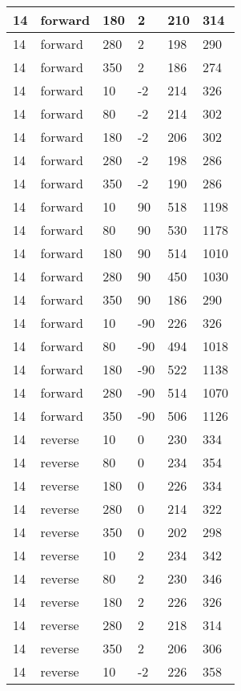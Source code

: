 \begin{table}
\begin{center}
\begin{tabular}{|l|l|l|l|l|l|}
			\hline
			14 & forward & 180 & 2 & 210 & 314 \\
			\hline
			14 & forward & 280 & 2 & 198 & 290 \\
			\hline
			14 & forward & 350 & 2 & 186 & 274 \\
			\hline
			14 & forward & 10 & -2 & 214 & 326 \\
			\hline
			14 & forward & 80 & -2 & 214 & 302 \\
			\hline
			14 & forward & 180 & -2 & 206 & 302 \\
			\hline
			14 & forward & 280 & -2 & 198 & 286 \\
			\hline
			14 & forward & 350 & -2 & 190 & 286 \\
			\hline
			14 & forward & 10 & 90 & 518 & 1198 \\
			\hline
			14 & forward & 80 & 90 & 530 & 1178 \\
			\hline
			14 & forward & 180 & 90 & 514 & 1010 \\
			\hline
			14 & forward & 280 & 90 & 450 & 1030 \\
			\hline
			14 & forward & 350 & 90 & 186 & 290 \\
			\hline
			14 & forward & 10 & -90 & 226 & 326 \\
			\hline
			14 & forward & 80 & -90 & 494 & 1018 \\
			\hline
			14 & forward & 180 & -90 & 522 & 1138 \\
			\hline
			14 & forward & 280 & -90 & 514 & 1070 \\
			\hline
			14 & forward & 350 & -90 & 506 & 1126 \\
			\hline
			14 & reverse & 10 & 0 & 230 & 334 \\
			\hline
			14 & reverse & 80 & 0 & 234 & 354 \\
			\hline
			14 & reverse & 180 & 0 & 226 & 334 \\
			\hline
			14 & reverse & 280 & 0 & 214 & 322 \\
			\hline
			14 & reverse & 350 & 0 & 202 & 298 \\
			\hline
			14 & reverse & 10 & 2 & 234 & 342 \\
			\hline
			14 & reverse & 80 & 2 & 230 & 346 \\
			\hline
			14 & reverse & 180 & 2 & 226 & 326 \\
			\hline
			14 & reverse & 280 & 2 & 218 & 314 \\
			\hline
			14 & reverse & 350 & 2 & 206 & 306 \\
			\hline
			14 & reverse & 10 & -2 & 226 & 358 \\

\end{tabular}
\end{center}
\end{table}

